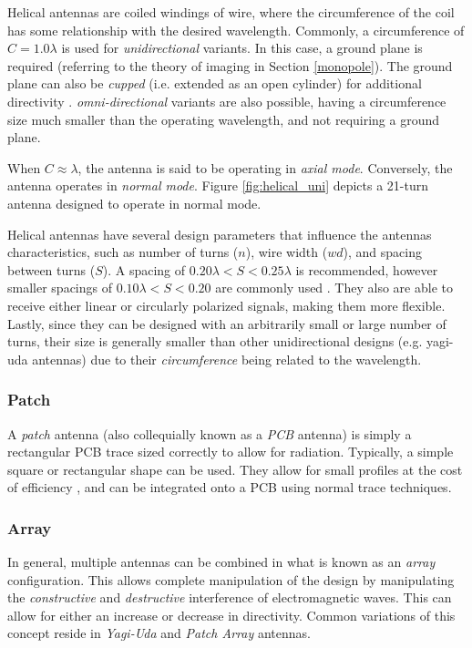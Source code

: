 Helical antennas are coiled windings of wire, where the circumference of the coil has some relationship with the desired wavelength. Commonly, a circumference of $C = 1.0 \lambda$ is used for \textit{unidirectional} variants. In this case, a ground plane is required (referring to the theory of imaging in Section \ref{monopole}). The ground plane can also be \textit{cupped} (i.e. extended as an open cylinder) for additional directivity \cite{textbook-antennaTheoryAnalysisDesign}. \textit{omni-directional} variants are also possible, having a circumference size much smaller than the operating wavelength, and not requiring a ground plane. \cite{site-helixAntennas}

When $C \approx \lambda$, the antenna is said to be operating in \textit{axial mode}. Conversely, the antenna operates in \textit{normal mode}. Figure \ref{fig:helical_uni} depicts a 21-turn antenna designed to operate in normal mode.

Helical antennas have several design parameters that influence the antennas characteristics, such as number of turns ($n$), wire width ($wd$), and spacing between turns ($S$). A spacing of $0.20 \lambda < S < 0.25 \lambda$ is recommended, however smaller spacings of $0.10 \lambda < S < 0.20$ are commonly used \cite{site-helicalCalculator}. They also are able to receive either linear or circularly polarized signals, making them more flexible. Lastly, since they can be designed with an arbitrarily small or large number of turns, their size is generally smaller than other unidirectional designs (e.g. yagi-uda antennas) due to their \textit{circumference} being related to the wavelength.

\subsubsection{Patch}
A \textit{patch} antenna (also collequially known as a \textit{PCB} antenna) is simply a rectangular PCB trace sized correctly to allow for radiation. Typically, a simple square or rectangular shape can be used. They allow for small profiles at the cost of efficiency \cite{site-antennaTheory}, and can be integrated onto a PCB using normal trace techniques.

\subsubsection{Array}
In general, multiple antennas can be combined in what is known as an \textit{array} configuration. This allows complete manipulation of the design by manipulating the \textit{constructive} and \textit{destructive} interference of electromagnetic waves. This can allow for either an increase or decrease in directivity. Common variations of this concept reside in \textit{Yagi-Uda} and \textit{Patch Array} antennas. \cite{site-antennaTheory}

